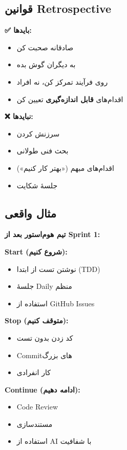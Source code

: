 \documentclass[12pt, a4paper]{article}
\begin{document}
\subsection{قوانین Retrospective}

\textbf{✅ بایدها:}
\begin{itemize}
    \item صادقانه صحبت کن
    \item به دیگران گوش بده
    \item روی فرآیند تمرکز کن، نه افراد
    \item اقدام‌های \textbf{قابل اندازه‌گیری} تعیین کن
\end{itemize}

\textbf{❌ نبایدها:}
\begin{itemize}
    \item سرزنش کردن
    \item بحث فنی طولانی
    \item اقدام‌های مبهم («بهتر کار کنیم»)
    \item جلسهٔ شکایت
\end{itemize}

\subsection{مثال واقعی}

\textbf{تیم هوم‌استور بعد از Sprint 1:}

\textbf{Start (شروع کنیم):}
\begin{itemize}
    \item نوشتن تست از ابتدا (TDD)
    \item جلسهٔ Daily منظم
    \item استفاده از GitHub Issues
\end{itemize}

\textbf{Stop (متوقف کنیم):}
\begin{itemize}
    \item کد زدن بدون تست
    \item Commitهای بزرگ
    \item کار انفرادی
\end{itemize}

\textbf{Continue (ادامه دهیم):}
\begin{itemize}
    \item Code Review
    \item مستندسازی
    \item استفاده از AI با شفافیت
\end{itemize}
\end{document}
